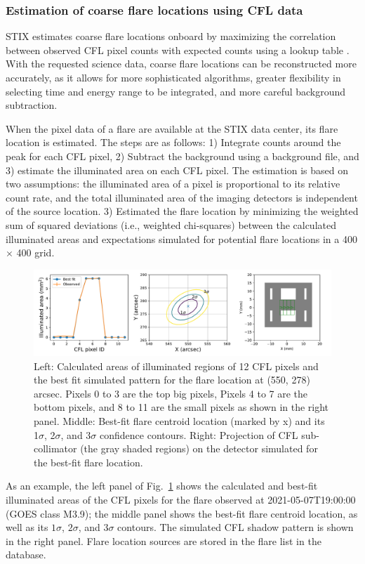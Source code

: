 \documentclass[referee]{aa} %
\begin{document}
\subsubsection{Estimation of coarse flare locations using CFL data}
STIX estimates coarse flare locations onboard by 
maximizing the correlation between observed CFL pixel counts with expected counts using a lookup table \cite{stix2020}. 
With the requested science data, coarse flare locations can be reconstructed more accurately, as it allows for more sophisticated algorithms, greater flexibility in selecting time and energy range to be integrated, and more careful background subtraction.

When the pixel data of a flare are available at the STIX data center, its flare location is estimated. The steps are as follows: 
1) Integrate counts around the peak for each CFL pixel, 
2) Subtract the background using a background file, and 3) estimate the illuminated area on each CFL pixel.  The estimation is based on two assumptions:  the illuminated area of a pixel is proportional to its relative count rate, and the total illuminated area of the imaging detectors is independent of the source location.
3) Estimated the flare location by minimizing the weighted sum of squared deviations (i.e., weighted chi-squares) between the calculated illuminated areas and expectations simulated for potential flare locations in a 400 $\times$ 400 grid.
\begin{figure}
  \centering
  \includegraphics[width=0.95\linewidth]{figures/cflMay07.pdf}
  \caption{
   Left: Calculated areas of illuminated regions of 12 CFL pixels and the best fit simulated pattern for the flare location at (550, 278) arcsec. Pixels 0 to 3 are the top big pixels, Pixels 4 to 7 are the bottom pixels, and 8 to 11 are the small pixels as shown in the right panel.
   Middle: Best-fit flare centroid location (marked by x) and its 1$\sigma$, 2$\sigma$, and 3$\sigma$ confidence contours. Right: Projection of CFL sub-collimator (the gray shaded regions) on the detector simulated for the best-fit flare location. }
  \label{fig:cfl}
\end{figure}
As an example, the left panel of Fig.~\ref{fig:cfl} shows the calculated and best-fit illuminated areas of the CFL pixels for the flare observed at 2021-05-07T19:00:00 (GOES class M3.9);  the middle panel shows the best-fit flare centroid location, as well as its $1\sigma$, $2\sigma$, and $3\sigma$ contours. 
The simulated CFL shadow pattern is shown in the right panel. 
Flare location sources are stored in the flare list in the database. 
\end{document}

